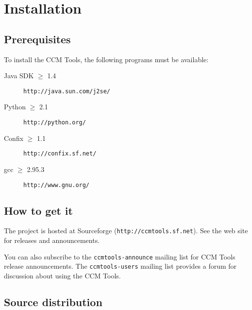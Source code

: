 
\chapter{Installation}

\section{Prerequisites}

To install the CCM Tools, the following programs must be available:
\begin{description}
\item [Java SDK $\ge$ 1.4] {\tt http://java.sun.com/j2se/}
\item [Python $\ge$ 2.1] {\tt http://python.org/}
\item [Confix $\ge$ 1.1] {\tt http://confix.sf.net/}
\item [gcc $\ge$ 2.95.3] {\tt http://www.gnu.org/}
\end{description}

\section{How to get it}

The project is hosted at Sourceforge ({\tt http://ccmtools.sf.net}). See the web
site for releases and announcements.

You can also subscribe to the {\tt ccmtools-announce} mailing list for CCM Tools
release announcements. The {\tt ccmtools-users} mailing list provides a forum
for discussion about using the CCM Tools.

\section{Source distribution}

